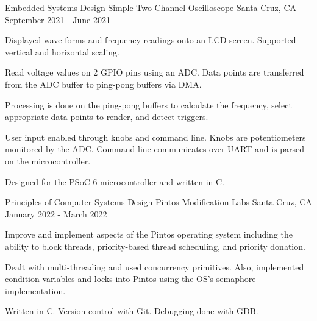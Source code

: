 
\begin{cventries}
  \cventry
    {Embedded Systems Design} %
    {Simple Two Channel Oscilloscope} %
    {Santa Cruz, CA} %
    {September 2021 - June 2021} %
    {
      \begin{cvitems} %
        \item {Displayed wave-forms and frequency readings onto an LCD screen. Supported vertical and horizontal scaling.}
        \item {Read voltage values on 2 GPIO pins using an ADC. Data points are transferred from the ADC buffer to ping-pong buffers via DMA.}
        \item {Processing is done on the ping-pong buffers to calculate the frequency, select appropriate data points to render, and detect triggers.}
        \item {User input enabled through knobs and command line. Knobs are potentiometers monitored by the ADC. Command line communicates over UART and is parsed on the microcontroller.}
      	\item {Designed for the PSoC-6 microcontroller and written in C.}
      \end{cvitems}
    }

  \cventry
    {Principles of Computer Systems Design} %
    {Pintos Modification Labs} %
    {Santa Cruz, CA} %
    {January 2022 - March 2022} %
    {
      \begin{cvitems} %
        \item {Improve and implement aspects of the Pintos operating system including the ability to block threads, priority-based thread scheduling, and priority donation.}
        \item {Dealt with multi-threading and used concurrency primitives. Also, implemented condition variables and locks into Pintos using the OS's semaphore implementation.}
        \item {Written in C. Version control with Git. Debugging done with GDB.}
      \end{cvitems}
    }
    

\end{cventries}
